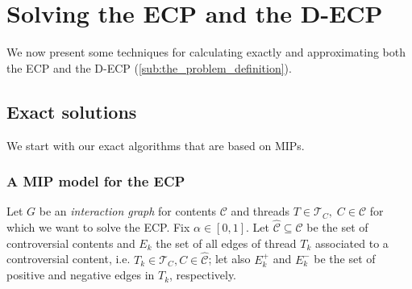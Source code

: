\chapter{Solving the \acrshort{ECP} and the \acrshort{D-ECP}}
\label{ch:solving}




We now present some techniques for calculating exactly and approximating both
the \acrshort{ECP} and the \acrshort{D-ECP} (\autoref{sub:the_problem_definition}).

\section{Exact solutions}%
\label{sec:exact-solutions}

We start with our exact algorithms that are based on MIPs.

\subsection{A MIP model for the \acrshort{ECP}}%
\label{sub:a_mip_model_for_the_ecp}

Let $G$ be an \emph{interaction graph} for contents $\mathcal{C} $ and
threads $T \in \mathcal{T}_{C}, \; C \in \mathcal{C} $ for which we want to
solve the \acrshort{ECP}. Fix
$\alpha \in [0, 1]$. Let $\mathcal{\hat{C}} \subseteq \mathcal{C} $ be the
set of controversial contents and $E_k$ the set
of all edges of thread $T_k$ associated to a controversial content, i.e. $T_{k}
	\in \mathcal{T}_{C}, C \in \mathcal{\hat{C}}$; let also $E^{+}_k $
and $E^{-}_k $ be the set of positive and negative edges in $T_k$, respectively.

